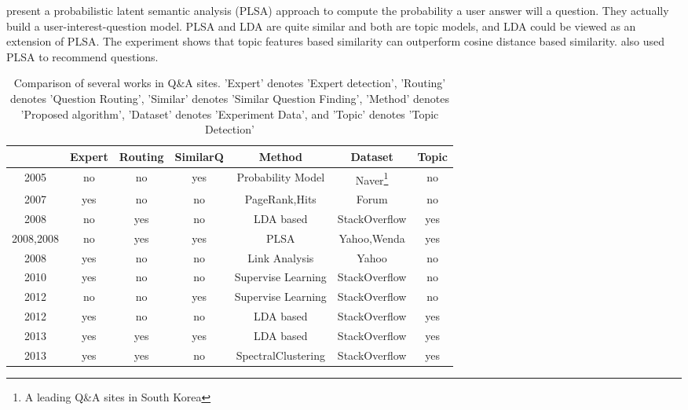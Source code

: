 \cite{chp2Qu:2009:WWW:PLSA:SimlarQ} 
present a probabilistic latent semantic analysis (PLSA) approach to compute the probability  a user answer will a question. 
They actually build a user-interest-question model. PLSA and LDA are quite similar and both are topic models, and LDA could be viewed as an extension of PLSA. The experiment shows that topic features based similarity can outperform cosine distance based similarity. \cite{chp2Wu:2008:PLSA:SimlarQ} also used PLSA to recommend questions.

\begin{sidewaystable}%
\centering
\begin{tabular}{|c|c|c|c|c|c|c|}
\hline
&Expert & Routing &SimilarQ& Method & Dataset &Topic   \\
\hline
\cite{chp2jeon2005finding} 2005&no&no&yes&Probability Model&Naver\footnote{A leading Q\&A sites in South Korea} & no \\
\hline
 \cite{zhang2007expertise} 2007& yes &no& no& PageRank,Hits&Forum&no  \\
\hline
\cite{Guo:2008:TPQ:1458082.1458204} 2008 & no&yes&no&LDA based&StackOverflow&yes\\
\hline
\cite{chp2Qu:2009:WWW:PLSA:SimlarQ} 2008,\cite{chp2Wu:2008:PLSA:SimlarQ}2008  & no&yes&yes&PLSA&Yahoo,Wenda & yes \\
\hline
\cite{chp2Bouguessa:2008:Identify:authority:indegree} 2008 & yes&no&no&Link Analysis&Yahoo&no\\
\hline
\cite{chp2Pal:2010:Expert:evolution} 2010&yes&no&no&Supervise Learning&StackOverflow&no \\
\hline
\cite{anderson2012discovering} 2012& no&no&yes&Supervise Learning&StackOverflow&no \\
\hline
\cite{chp2Zhou:2012:TPM:2396761.2398493} 2012 & yes & no & no&LDA based &StackOverflow&yes\\
\hline
\cite{yang2013cqarank} 2013& yes&yes&yes& LDA based&StackOverflow&yes   \\
\hline
\cite{Chang:2013}2013 & yes&yes&no& SpectralClustering&StackOverflow&yes  \\
\hline
\end{tabular}
\caption{Comparison of several works in Q\&A sites. 'Expert' denotes 'Expert detection', 'Routing' denotes 'Question Routing', 'Similar' denotes 'Similar Question Finding', 'Method' denotes 'Proposed algorithm', 'Dataset' denotes 'Experiment Data', and 'Topic' denotes 'Topic Detection'}
\label{tab:workcompare}
\end{sidewaystable}





